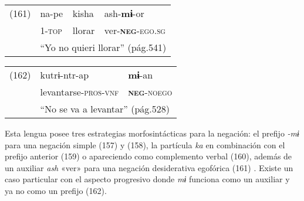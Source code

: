 {%
\begin{tabular}{llll}
(161) & na-pe & kisha & ash-\textbf{mɨ}-or \\
& \textsc{1-top} & llorar & ver-\textsc{\textbf{neg}-ego.sg} \\
& \multicolumn{3}{l}{``Yo no quieri llorar'' (pág.541)}
\end{tabular} \vspace{0.5cm}

\begin{tabular}{lll}
(162) & kutrɨ-ntr-ap & \textbf{mɨ}-an \\
& levantarse-\textsc{pros-vnf} & \textsc{\textbf{neg}-noego} \\
& \multicolumn{2}{l}{``No se va a levantar'' (pág.528)}
\end{tabular} \vspace{0.5cm}

}

Esta lengua posee tres estrategias morfosintácticas para la negación: el prefijo {\setmainfont{Charis SIL} \textit{-mɨ}} para una negación simple (157) y (158), la partícula {\setmainfont{Charis SIL} \textit{ka}} en combinación con el prefijo anterior (159) o apareciendo como complemento verbal (160), además de un auxiliar {\setmainfont{Charis SIL} \textit{ash}} «ver» para una negación desiderativa egofórica (161) \textcolor{MidnightBlue}{\citep{namtrik}}. Existe un caso particular con el aspecto progresivo donde {\setmainfont{Charis SIL} \textit{mɨ}} funciona como un auxiliar y ya no como un prefijo (162).